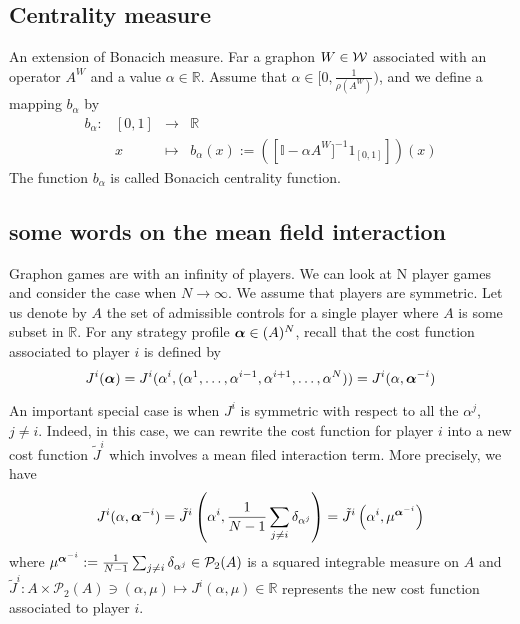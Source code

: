 \subsection{Centrality measure}
An extension of Bonacich measure. Far a graphon $W \in {\cal W}$ associated with an operator $A^W$ and a value $\alpha \in \mathbb{R}$. Assume that $\alpha \in [0, \frac{1}{\rho(A^W)} )$, and we define a mapping $b_\alpha$ by
\begin{equation}
\begin{array}{rccl}
	b_\alpha: &[0,1] &\longrightarrow & \mathbb{R}\\
	& x & \mapsto & b_\alpha(x) := \left( \left[ \mathbb{I} - \alpha A^W ]^{-1} 1_{[0,1]} \right] \right)(x)
\end{array}
\end{equation}
The function $b_\alpha$ is called Bonacich centrality function.


\subsection{some words on the mean field interaction}

Graphon games are with an infinity of players. We can look at N player games and consider the case when $N \to \infty$. We assume that players are symmetric. Let us denote by $A$ the set of admissible controls for a single player where $A$ is some subset in $\mathbb{R}$.  For any strategy profile $\boldsymbol{\alpha} \in (A)^N$, recall that the cost function associated to player $i$ is defined by
\begin{equation}
	J^i(\boldsymbol{\alpha}) = J^i(\alpha^i, (\alpha^1, \ldots, \alpha^{i-1}, \alpha^{i+1}, \ldots, \alpha^N)) = J^i(\alpha, \boldsymbol{\alpha}^{-i})
\end{equation}

An important special case is when $J^i$ is symmetric with respect to all the $\alpha^j$, $j\neq i$. Indeed, in this case, we can rewrite the cost function for player $i$ into a new cost function $\tilde{J}^i$ which involves a mean filed interaction term. More precisely, we have
\begin{equation}
	J^i(\alpha, \boldsymbol{\alpha}^{-i}) = \tilde{J}^i\left(\alpha^i, \frac{1}{N-1} \sum_{j\neq i} \delta_{\alpha^j} \right) = \tilde{J}^i\left(\alpha^i, \mu^{\boldsymbol{\alpha}^{-i}} \right)
\end{equation}
where $\mu^{\boldsymbol{\alpha}^{-i}} := \frac{1}{N-1} \sum_{j\neq i} \delta_{\alpha^j} \in \mathcal{P}_2(A)$ is a squared integrable measure on $A$ and $\tilde{J}^i : A \times \mathcal{P}_2(A) \ni (\alpha, \mu) \mapsto J^i(\alpha, \mu) \in \mathbb{R}$ represents the new cost function associated to player $i$.\\

